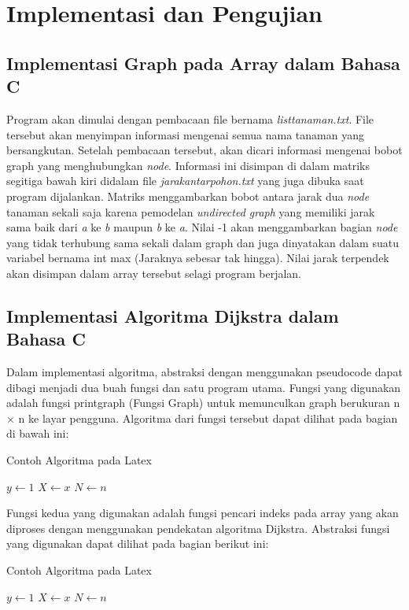 \documentclass[conference]{IEEEtran}
\begin{document}
\section{Implementasi dan Pengujian}
\subsection{Implementasi Graph pada Array dalam Bahasa C}
Program akan dimulai dengan pembacaan file bernama \textit{listtanaman.txt}. File tersebut akan menyimpan informasi mengenai semua nama tanaman yang bersangkutan. Setelah pembacaan tersebut, akan dicari informasi mengenai bobot graph yang menghubungkan \textit{node}. Informasi ini disimpan di dalam matriks segitiga bawah kiri didalam file \textit{jarakantarpohon.txt} yang juga dibuka saat program dijalankan. Matriks menggambarkan bobot antara jarak dua \textit{node} tanaman sekali saja karena pemodelan \textit{undirected 
graph} yang memiliki jarak sama baik dari \textit{a} ke \textit{b} maupun \textit{b} ke \textit{a}. Nilai -1 akan menggambarkan bagian \textit{node} yang tidak terhubung sama sekali dalam graph dan juga dinyatakan dalam suatu variabel bernama int max (Jaraknya sebesar tak hingga). Nilai jarak terpendek akan disimpan dalam array tersebut selagi program berjalan.

\subsection{Implementasi Algoritma Dijkstra dalam Bahasa C}
Dalam implementasi algoritma, abstraksi dengan menggunakan pseudocode dapat dibagi menjadi dua buah fungsi dan satu program utama. Fungsi yang digunakan adalah fungsi printgraph (Fungsi Graph) untuk memunculkan graph berukuran n × n ke layar pengguna.
Algoritma dari fungsi tersebut dapat dilihat pada bagian di bawah ini:
\begin{algorithm}
    \caption{Contoh Algoritma pada Latex}
    $y \gets 1$\;
    $X \gets x$\;
    $N \gets n$\;
\end{algorithm}

Fungsi kedua yang digunakan adalah fungsi pencari indeks pada array yang akan diproses dengan menggunakan pendekatan algoritma Dijkstra. Abstraksi fungsi yang digunakan dapat dilihat pada bagian berikut ini: 
\begin{algorithm}
    \caption{Contoh Algoritma pada Latex}
    $y \gets 1$\;
    $X \gets x$\;
    $N \gets n$\;
\end{algorithm}
\end{document}
